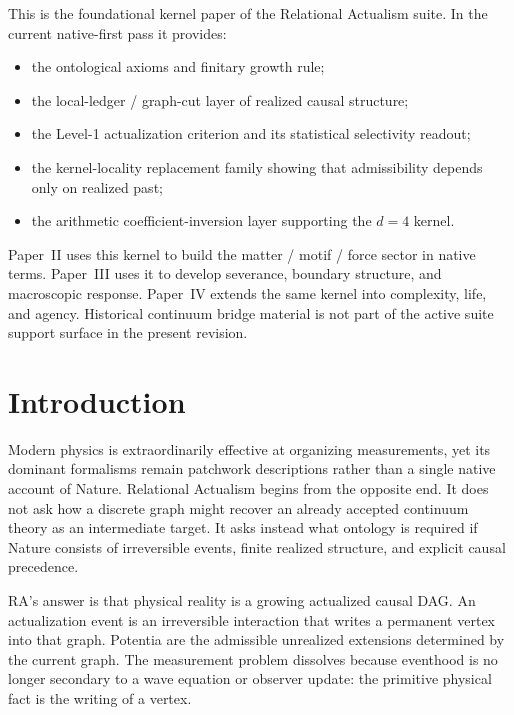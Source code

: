 \documentclass[11pt]{article}
\begin{document}
\begin{tcolorbox}[title=Place of This Paper in the RA Suite,colback=gray!5,colframe=gray!60]
This is the foundational kernel paper of the Relational Actualism suite. In the current native-first pass it provides:
\begin{itemize}[nosep]
    \item the ontological axioms and finitary growth rule;
    \item the local-ledger / graph-cut layer of realized causal structure;
    \item the Level-1 actualization criterion and its statistical selectivity readout;
    \item the kernel-locality replacement family showing that admissibility depends only on realized past;
    \item the arithmetic coefficient-inversion layer supporting the $d=4$ kernel.
\end{itemize}
Paper~II uses this kernel to build the matter / motif / force sector in native terms. Paper~III uses it to develop severance, boundary structure, and macroscopic response. Paper~IV extends the same kernel into complexity, life, and agency. Historical continuum bridge material is not part of the active suite support surface in the present revision.
\end{tcolorbox}

\section{Introduction}

Modern physics is extraordinarily effective at organizing measurements, yet its dominant formalisms remain patchwork descriptions rather than a single native account of Nature. Relational Actualism begins from the opposite end. It does not ask how a discrete graph might recover an already accepted continuum theory as an intermediate target. It asks instead what ontology is required if Nature consists of irreversible events, finite realized structure, and explicit causal precedence.

RA's answer is that physical reality is a growing actualized causal DAG. An actualization event is an irreversible interaction that writes a permanent vertex into that graph. Potentia are the admissible unrealized extensions determined by the current graph. The measurement problem dissolves because eventhood is no longer secondary to a wave equation or observer update: the primitive physical fact is the writing of a vertex.
\end{document}
